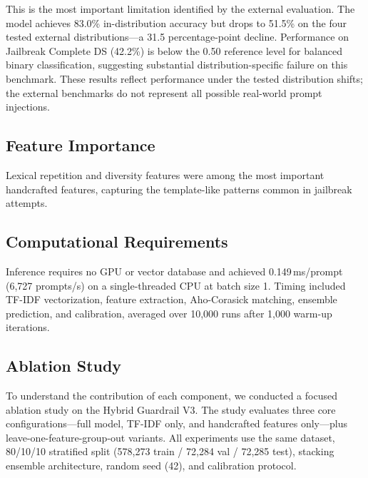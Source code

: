 \documentclass[12pt,a4paper]{article}
\begin{document}
This is the most important limitation identified by the external evaluation. The model achieves 83.0\% in-distribution accuracy but drops to 51.5\% on the four tested external distributions---a 31.5 percentage-point decline. Performance on Jailbreak Complete DS (42.2\%) is below the 0.50 reference level for balanced binary classification, suggesting substantial distribution-specific failure on this benchmark. These results reflect performance under the tested distribution shifts; the external benchmarks do not represent all possible real-world prompt injections.

\subsection{Feature Importance}

Lexical repetition and diversity features were among the most important handcrafted features, capturing the template-like patterns common in jailbreak attempts.

\subsection{Computational Requirements}

Inference requires no GPU or vector database and achieved 0.149\,ms/prompt (6,727 prompts/s) on a single-threaded CPU at batch size 1. Timing included TF-IDF vectorization, feature extraction, Aho-Corasick matching, ensemble prediction, and calibration, averaged over 10,000 runs after 1,000 warm-up iterations.

\subsection{Ablation Study}\label{sec:ablation}

To understand the contribution of each component, we conducted a focused ablation study on the Hybrid Guardrail V3. The study evaluates three core configurations---full model, TF-IDF only, and handcrafted features only---plus leave-one-feature-group-out variants. All experiments use the same dataset, 80/10/10 stratified split (578,273 train / 72,284 val / 72,285 test), stacking ensemble architecture, random seed (42), and calibration protocol.
\end{document}
